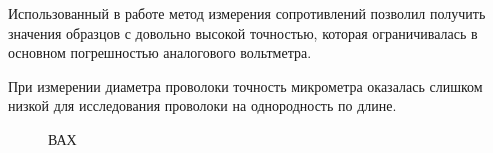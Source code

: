 \documentclass[a4paper, 12pt]{article}
\begin{document}
        Использованный в работе метод измерения сопротивлений позволил получить значения 
    образцов с довольно высокой точностью, которая ограничивалась в основном погрешностью аналогового вольтметра.
	
	При измерении диаметра проволоки точность микрометра оказалась слишком низкой для исследования проволоки на однородность по длине.
	
	
		
	

    \bigskip

    \space

    \pgfplotsset{width= 18cm,compat=1.9}
    
    \begin{figure}
        \centering
        \caption{ВАХ}
    \end{figure}



 
\end{document}
